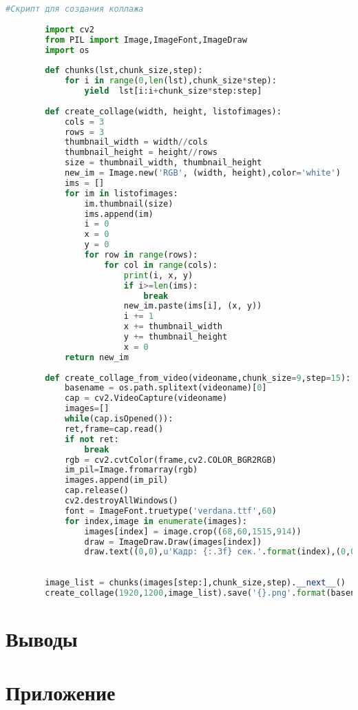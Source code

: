 \documentclass[12pt,a4paper]{article}
\newcommand{\названиеРаботы}
{Разработка модели сверточной нейронной сети, обученную на сгенерированных размеченных данных СКТ}
\newcommand{\идРаботы}
{8888.00.0019-0019/001}
\newcommand{\темаРаботы}
{СКТ}
\newcommand{\номерСлужебки}
{}
\newcommand{\ДолжностьАвтораОтчета}{Инженер}
\newcommand{\НашОтдел}{Научно-исследовательский центр суперкомпьютерных технологий}
\newcommand{\НазваниеДокумента}{Служебная записка}
\newcommand{\КомуСлужебкаДолжность}{Заместителю технического директора}
\newcommand{\КомуСлужебкаФИО}{Никитушкину М.В.}
\newcommand{\ОтКогоСлужебкаДолжность}{\ДолжностьАвтораОтчета}
\newcommand{\ОтКогоСлужебкаФИО}{Ниженко И.А.}
\newcommand{\ИсполнительФИО}{Ниженко И.А. \\тел.:    75-39}
\begin{document}
	\pagebreak
	\begin{lstlisting}[language=Python]
	#Скрипт для создания коллажа
		
		import cv2
		from PIL import Image,ImageFont,ImageDraw
		import os
		
		def chunks(lst,chunk_size,step):
			for i in range(0,len(lst),chunk_size*step):
				yield  lst[i:i+chunk_size*step:step]
		
		def create_collage(width, height, listofimages):
			cols = 3
			rows = 3
			thumbnail_width = width//cols
			thumbnail_height = height//rows
			size = thumbnail_width, thumbnail_height
			new_im = Image.new('RGB', (width, height),color='white')
			ims = []
			for im in listofimages:
				im.thumbnail(size)
				ims.append(im)
				i = 0
				x = 0
				y = 0
				for row in range(rows):
					for col in range(cols):
						print(i, x, y)
						if i>=len(ims):
							break
						new_im.paste(ims[i], (x, y))
						i += 1
						x += thumbnail_width
						y += thumbnail_height
						x = 0
			return new_im
	
		def create_collage_from_video(videoname,chunk_size=9,step=15):
			basename = os.path.splitext(videoname)[0]
			cap = cv2.VideoCapture(videoname)
			images=[]
			while(cap.isOpened()):
			ret,frame=cap.read()
			if not ret:
				break
			rgb = cv2.cvtColor(frame,cv2.COLOR_BGR2RGB)
			im_pil=Image.fromarray(rgb)
			images.append(im_pil)
			cap.release()
			cv2.destroyAllWindows()
			font = ImageFont.truetype('verdana.ttf',60)
			for index,image in enumerate(images):
				images[index] = image.crop((68,60,1515,914))
				draw = ImageDraw.Draw(images[index])
				draw.text((0,0),u'Кадр: {:.3f} сек.'.format(index),(0,0,0),font=font)
		
		
		image_list = chunks(images[step:],chunk_size,step).__next__()
		create_collage(1920,1200,image_list).save('{}.png'.format(basename.replace('.','_')))
	\end{lstlisting}
	\newpage
	\section{Выводы}

	\newpage


	\switchToLayoutPageAthreeLandscape{}
	\appendix
	\section{Приложение}
\end{document}
